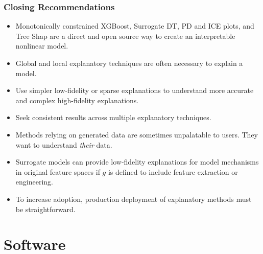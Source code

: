 \documentclass[11pt,
               aspectratio=169
               ]{beamer}
\begin{document}
		\begin{frame}
		
			\frametitle{Closing Recommendations}
			
				\begin{itemize}
					
					\item Monotonically constrained XGBoost, Surrogate DT, PD and ICE plots, and Tree Shap are a direct and open source way to create an interpretable nonlinear model.
					
					\item Global and local explanatory techniques are often necessary to explain a model.
					
					\item Use simpler low-fidelity or sparse explanations to understand more accurate and complex high-fidelity explanations.  
					
					\item Seek consistent results across multiple explanatory techniques. 
					
					\item Methods relying on generated data are sometimes unpalatable to users. They want to understand \textit{their} data.
					
					\item Surrogate models can provide low-fidelity explanations for model mechanisms in original feature spaces if $g$ is defined to include feature extraction or engineering.
					
					\item To increase adoption, production deployment of explanatory methods must be straightforward.
					
				\end{itemize}
			
			
		\end{frame}

	\section{Software}
\end{document}
